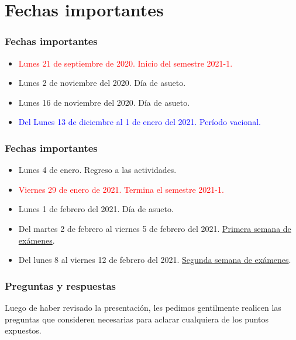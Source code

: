 \section{Fechas importantes}
\begin{frame}
\frametitle{Fechas importantes}
\fontsize{12}{12}\selectfont
\begin{itemize}
\item \textcolor{red}{Lunes 21 de septiembre de 2020. Inicio del semestre 2021-1.}
\item Lunes 2 de noviembre del 2020. Día de asueto.
\item Lunes 16 de noviembre del 2020. Día de asueto.
\item \textcolor{blue}{Del Lunes 13 de diciembre al 1 de enero del 2021. Período vacional.}
\end{itemize}
\end{frame}
\begin{frame}
\frametitle{Fechas importantes}
\fontsize{12}{12}\selectfont
\begin{itemize}
\item Lunes 4 de enero. Regreso a las actividades.
\item \textcolor{red}{Viernes 29 de enero de 2021. Termina el semestre 2021-1.}
\item Lunes 1 de febrero del 2021. Día de asueto.
\item Del martes 2 de febrero al viernes 5 de febrero del 2021. \underline{Primera semana de exámenes}.
\item Del lunes 8 al viernes 12 de febrero del 2021. \underline{Segunda semana de exámenes}.
\end{itemize}
\end{frame}
\begin{frame}
\frametitle{Preguntas y respuestas}
Luego de haber revisado la presentación, les pedimos gentilmente realicen las preguntas que consideren necesarias para aclarar cualquiera de los puntos expuestos.
\end{frame}
